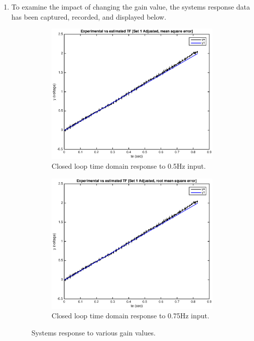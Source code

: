 \documentclass[11pt,a4paper]{article}
\begin{document}
\begin{enumerate}
	\pagebreak
	\item To examine the impact of changing the gain value, the systems response data has been captured, recorded, and displayed below.
	\begin{figure}[H]
	  \begin{subfigure}{0.5\textwidth}
	  \includegraphics[width=0.9\linewidth]{Matlab_Figures/y2_dataset1_ms.eps} 
	  \caption{Closed loop time domain response to 0.5Hz input.}
	  \label{fig:subim1}
	  \end{subfigure}
	  \begin{subfigure}{0.5\textwidth}
	  \includegraphics[width=0.9\linewidth]{Matlab_Figures/y2_dataset1_rms.eps}
	  \caption{Closed loop time domain response to 0.75Hz input.}
	  \label{fig:subim2}
	  \end{subfigure}
	  \caption{\label{fig:gainimpact}Systems response to various gain values.}
	\end{figure}
	

\end{enumerate}
\end{document}
